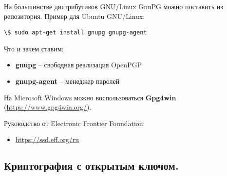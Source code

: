 \documentclass[presentation]{beamer}
\newcommand{\RaisedRightHand}{%
  \raisebox{-.50em}{\Large\HandRight}
}
\begin{document}
\begin{frame}[fragile]{}
  На большинстве дистрибутивов GNU/Linux GnuPG можно поставить из
  репозитория.  Пример для Ubuntu GNU/Linux:
\begin{Verbatim}[commandchars=\\\[\]]
\$ sudo apt-get install gnupg gnupg-agent
\end{Verbatim}
\vspace{5 mm}
Что и зачем ставим:
\begin{itemize}
\item \textbf{gnupg} -- свободная реализация OpenPGP
\item \textbf{gnupg-agent} -- менеджер паролей\newline
\end{itemize}

На Microsoft Windows можно воспользоваться \textbf{Gpg4win}
(\url{https://www.gpg4win.org/}).\newline

\bigskip

\RaisedRightHand Руководство от Electronic Frontier Foundation:
\begin{itemize}
\item \url{https://ssd.eff.org/ru}
\end{itemize}
\end{frame}



\subsection{Криптография с открытым ключом.}
\end{document}
